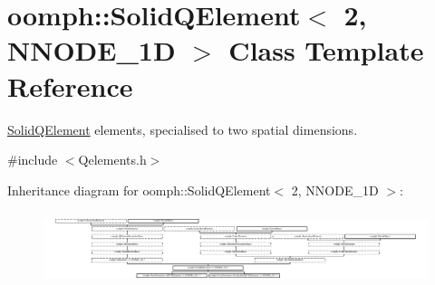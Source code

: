 \hypertarget{classoomph_1_1SolidQElement_3_012_00_01NNODE__1D_01_4}{}\section{oomph\+:\+:Solid\+Q\+Element$<$ 2, N\+N\+O\+D\+E\+\_\+1D $>$ Class Template Reference}
\label{classoomph_1_1SolidQElement_3_012_00_01NNODE__1D_01_4}


\hyperlink{classoomph_1_1SolidQElement}{Solid\+Q\+Element} elements, specialised to two spatial dimensions.  




{\ttfamily \#include $<$Qelements.\+h$>$}

Inheritance diagram for oomph\+:\+:Solid\+Q\+Element$<$ 2, N\+N\+O\+D\+E\+\_\+1D $>$\+:\begin{figure}[H]
\begin{center}
\leavevmode
\includegraphics[height=2.143541cm]{classoomph_1_1SolidQElement_3_012_00_01NNODE__1D_01_4}
\end{center}
\end{figure}
